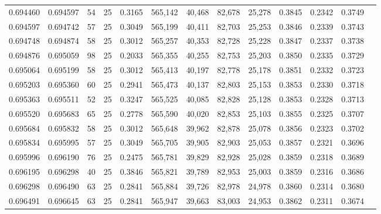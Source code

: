\begin{tabular}{rrrrrrrrrrrrr}
0.694460 & 0.694597 &    54 &  25 &                                     0.3165 & 565,142 &  40,468 &  82,678 &  25,278 & 0.3845 & 0.2342 & 0.3749 \\
0.694597 & 0.694742 &    57 &  25 &                                     0.3049 & 565,199 &  40,411 &  82,703 &  25,253 & 0.3846 & 0.2339 & 0.3743 \\
0.694748 & 0.694874 &    58 &  25 &                                     0.3012 & 565,257 &  40,353 &  82,728 &  25,228 & 0.3847 & 0.2337 & 0.3738 \\
0.694876 & 0.695059 &    98 &  25 &                                     0.2033 & 565,355 &  40,255 &  82,753 &  25,203 & 0.3850 & 0.2335 & 0.3729 \\
0.695064 & 0.695199 &    58 &  25 &                                     0.3012 & 565,413 &  40,197 &  82,778 &  25,178 & 0.3851 & 0.2332 & 0.3723 \\
0.695203 & 0.695360 &    60 &  25 &                                     0.2941 & 565,473 &  40,137 &  82,803 &  25,153 & 0.3853 & 0.2330 & 0.3718 \\
0.695363 & 0.695511 &    52 &  25 &                                     0.3247 & 565,525 &  40,085 &  82,828 &  25,128 & 0.3853 & 0.2328 & 0.3713 \\
0.695520 & 0.695683 &    65 &  25 &                                     0.2778 & 565,590 &  40,020 &  82,853 &  25,103 & 0.3855 & 0.2325 & 0.3707 \\
0.695684 & 0.695832 &    58 &  25 &                                     0.3012 & 565,648 &  39,962 &  82,878 &  25,078 & 0.3856 & 0.2323 & 0.3702 \\
0.695834 & 0.695995 &    57 &  25 &                                     0.3049 & 565,705 &  39,905 &  82,903 &  25,053 & 0.3857 & 0.2321 & 0.3696 \\
0.695996 & 0.696190 &    76 &  25 &                                     0.2475 & 565,781 &  39,829 &  82,928 &  25,028 & 0.3859 & 0.2318 & 0.3689 \\
0.696195 & 0.696298 &    40 &  25 &                                     0.3846 & 565,821 &  39,789 &  82,953 &  25,003 & 0.3859 & 0.2316 & 0.3686 \\
0.696298 & 0.696490 &    63 &  25 &                                     0.2841 & 565,884 &  39,726 &  82,978 &  24,978 & 0.3860 & 0.2314 & 0.3680 \\
0.696491 & 0.696645 &    63 &  25 &                                     0.2841 & 565,947 &  39,663 &  83,003 &  24,953 & 0.3862 & 0.2311 & 0.3674 \\

\end{tabular}
